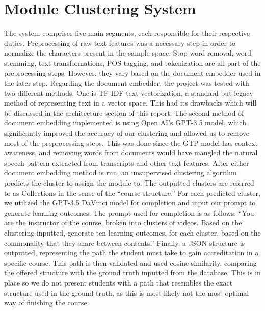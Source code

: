 \chapter{Module Clustering System}
\label{ch:mcs}

The system comprises five main segments, each responsible for their respective duties. Preprocessing of raw text features was a necessary step in order to normalize the characters present in the sample space. Stop word removal, word stemming, text transformations, POS tagging, and tokenization are all part of the preprocessing steps. However, they vary based on the document embedder used in the later step. Regarding the document embedder, the project was tested with two different methods. One is TF-IDF text vectorization, a standard but legacy method of representing text in a vector space. This had its drawbacks which will be discussed in the architecture section of this report. The second method of document embedding implemented is using Open AI's GPT-3.5 model, which significantly improved the accuracy of our clustering and allowed us to remove most of the preprocessing steps. This was done since the GTP model has context awareness, and removing words from documents would have mangled the natural speech pattern extracted from transcripts and other text features. After either document embedding method is run, an unsupervised clustering algorithm predicts the cluster to assign the module to. The outputted clusters are referred to as Collections in the sense of the “course structure.” For each predicted cluster, we utilized the GPT-3.5 DaVinci model for completion and input our prompt to generate learning outcomes. The prompt used for completion is as follows: “You are the instructor of the course, broken into clusters of videos. Based on the clustering inputted, generate ten learning outcomes, for each cluster, based on the commonality that they share between contents.” Finally, a JSON structure is outputted, representing the path the student must take to gain accreditation in a specific course. This path is then validated and used cosine similarity, comparing the offered structure with the ground truth inputted from the database. This is in place so we do not present students with a path that resembles the exact structure used in the ground truth, as this is most likely not the most optimal way of finishing the course.
